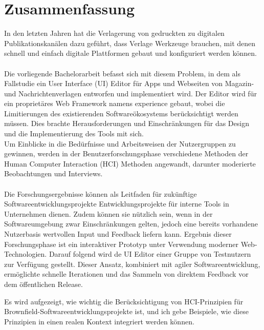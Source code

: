 %

\chapter*{Zusammenfassung}

In den letzten Jahren hat die Verlagerung von gedruckten zu digitalen Publikationskanälen dazu geführt, dass Verlage Werkzeuge brauchen, mit denen schnell und einfach digitale Plattformen gebaut und konfiguriert werden können.
\\\\
Die vorliegende Bachelorarbeit befasst sich mit diesem Problem, in dem als Fallstudie ein User Interface (UI) Editor für Apps und Webseiten von Magazin- und Nachrichtenverlagen entworfen und implementiert wird.
Der Editor wird für ein proprietäres Web Framework namens \Gls{experience} gebaut, wobei die Limitierungen des existierenden Softwareökosystems berücksichtigt werden müssen.
Dies brachte Herausforderungen und Einschränkungen für das Design und die Implementierung des Tools mit sich.
\\
Um Einblicke in die Bedürfnisse und Arbeitsweisen der Nutzergruppen zu gewinnen, werden in der Benutzerforschungsphase verschiedene Methoden der Human Computer Interaction (HCI)
Methoden angewandt, darunter moderierte Beobachtungen und Interviews.
\\\\
Die Forschungsergebnisse können als Leitfaden für zukünftige Softwareentwicklungsprojekte
Entwicklungsprojekte für interne Tools in Unternehmen dienen.
Zudem können sie nützlich sein, wenn in der Softwareumgebung zwar Einschränkungen gelten, jedoch eine bereits vorhandene Nutzerbasis wertvollen Input und Feedback liefern kann.
Ergebnis dieser Forschungsphase ist ein interaktiver Prototyp unter Verwendung moderner Web-Technologien. Darauf folgend wird de UI Editor einer Gruppe von Testnutzern zur Verfügung gestellt.
Dieser Ansatz, kombiniert mit agiler Softwareentwicklung, ermöglichte schnelle Iterationen und das Sammeln von direktem Feedback vor dem öffentlichen Release.

Es wird aufgezeigt, wie wichtig die Berücksichtigung von HCI-Prinzipien für Brownfield-Softwareentwicklungsprojekte ist, und ich gebe Beispiele, wie diese Prinzipien in einen realen Kontext integriert werden können.